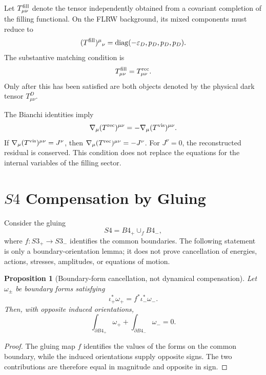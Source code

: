 \documentclass[11pt,a4paper]{article}
\def\Bfour{B4}%
\def\Sthree{S3}%
\def\Sfour{S4}%
\numberwithin{equation}{section}
\newtheorem{proposition}[criterion]{Proposition}
\theoremstyle{remark}
\newcommand{\Sthree}{S^3}
\newcommand{\Sfour}{S^4}
\newcommand{\Bfour}{B^4}
\newcommand{\epsD}{\varepsilon_D}
\newcommand{\pD}{p_D}
\newcommand{\diag}{\operatorname{diag}}
\begin{document}
Let \(T^{\rm fill}_{\mu\nu}\) denote the tensor independently obtained from a covariant completion of the filling functional. On the FLRW background, its mixed components must reduce to
\begin{equation}
(T^{\rm fill})^{\mu}{}_{\nu}=\diag(-\epsD,\pD,\pD,\pD).
\end{equation}
The substantive matching condition is
\begin{equation}
T^{\rm fill}_{\mu\nu}=T^{\rm rec}_{\mu\nu}.
\end{equation}
Only after this has been satisfied are both objects denoted by the physical dark tensor \(T^D_{\mu\nu}\).

The Bianchi identities imply
\begin{equation}
\nabla_\mu(T^{\rm rec})^{\mu\nu}=-\nabla_\mu(T^{\rm vis})^{\mu\nu}.
\end{equation}
If \(\nabla_\mu(T^{\rm vis})^{\mu\nu}=J^\nu\), then \(\nabla_\mu(T^{\rm rec})^{\mu\nu}=-J^\nu\). For \(J^\nu=0\), the reconstructed residual is conserved. This condition does not replace the equations for the internal variables of the filling sector.

\section{\texorpdfstring{$\Sfour$}{S4} Compensation by Gluing}
Consider the gluing
\begin{equation}
\Sfour=\Bfour_+\cup_f\Bfour_-,
\end{equation}
where \(f:\Sthree_+\to\Sthree_-\) identifies the common boundaries. The following statement is only a boundary-orientation lemma; it does not prove cancellation of energies, actions, stresses, amplitudes, or equations of motion.

\begin{proposition}[Boundary-form cancellation, not dynamical compensation]
Let \(\omega_\pm\) be boundary forms satisfying
\begin{equation}
\iota_+^*\omega_+=f^*\iota_-^*\omega_-.
\end{equation}
Then, with opposite induced orientations,
\begin{equation}
\int_{\partial\Bfour_+}\omega_+ + \int_{\partial\Bfour_-}\omega_-=0.
\end{equation}
\end{proposition}
\begin{proof}
The gluing map \(f\) identifies the values of the forms on the common boundary, while the induced orientations supply opposite signs. The two contributions are therefore equal in magnitude and opposite in sign.
\end{proof}
\end{document}

